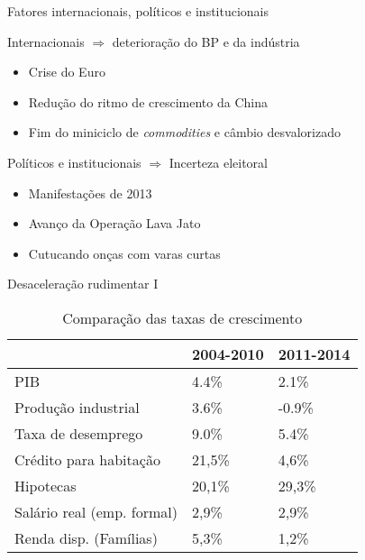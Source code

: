 \documentclass[presentation]{beamer}
\begin{document}
\begin{frame}[label={sec:org4cc5260}]{Fatores internacionais, políticos e institucionais}
\begin{block}{Internacionais \(\Rightarrow\) deterioração do BP e da indústria}
\begin{itemize}
\item Crise do Euro
\item Redução do ritmo de crescimento da China
\item Fim do miniciclo de \emph{commodities} e câmbio desvalorizado
\end{itemize}
\end{block}
\begin{block}{Políticos  e institucionais \(\Rightarrow\) Incerteza eleitoral}
\begin{itemize}
\item Manifestações de 2013
\item Avanço da Operação Lava Jato
\item Cutucando onças com varas curtas \cite{singer_cutucando_2015}
\end{itemize}
\end{block}
\end{frame}

\begin{frame}[label={sec:orgf33f8f1}]{Desaceleração rudimentar I}
\begin{table}[htbp]
\caption{Comparação das taxas de crescimento}
\centering
\begin{tabular}{lll}
\hline
 & 2004-2010 & 2011-2014\\
\hline
PIB & 4.4\% & 2.1\%\\
Produção industrial & 3.6\% & -0.9\%\\
Taxa de desemprego & 9.0\% & 5.4\%\\
Crédito para habitação & 21,5\% & 4,6\%\\
Hipotecas & 20,1\% & 29,3\%\\
Salário real (emp. formal) & 2,9\% & 2,9\%\\
Renda disp. (Famílias) & 5,3\% & 1,2\%\\
\hline
\end{tabular}
\end{table}
\end{frame}
\end{document}

